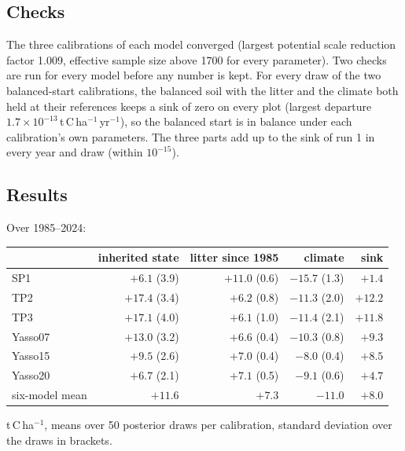 \documentclass[../HIKET_draft_v1.tex]{subfiles}
\begin{document}
\subsection{Checks}
\label{app:attr_checks}

The three calibrations of each model converged (largest potential scale reduction factor
1.009, effective sample size above 1700 for every parameter). Two checks are run for every
model before any number is kept. For every draw of the two balanced-start calibrations, the
balanced soil with the litter and the climate both held at their references keeps a sink of
zero on every plot (largest departure $1.7\times10^{-13}$\,t\,C\,ha$^{-1}$\,yr$^{-1}$), so the
balanced start is in balance under each calibration's own parameters. The three parts add up
to the sink of run 1 in every year and draw (within $10^{-15}$).

\subsection{Results}
\label{app:attr_results}

Over 1985--2024:

\begin{center}
\small
\begin{tabular}{lrrrr}
\hline
 & inherited state & litter since 1985 & climate & sink \\
\hline
SP1     & $+6.1$ (3.9)  & $+11.0$ (0.6) & $-15.7$ (1.3) & $+1.4$  \\
TP2     & $+17.4$ (3.4) & $+6.2$ (0.8)  & $-11.3$ (2.0) & $+12.2$ \\
TP3     & $+17.1$ (4.0) & $+6.1$ (1.0)  & $-11.4$ (2.1) & $+11.8$ \\
Yasso07 & $+13.0$ (3.2) & $+6.6$ (0.4)  & $-10.3$ (0.8) & $+9.3$  \\
Yasso15 & $+9.5$ (2.6)  & $+7.0$ (0.4)  & $-8.0$ (0.4)  & $+8.5$  \\
Yasso20 & $+6.7$ (2.1)  & $+7.1$ (0.5)  & $-9.1$ (0.6)  & $+4.7$  \\
\hline
six-model mean & $+11.6$ & $+7.3$ & $-11.0$ & $+8.0$ \\
\hline
\end{tabular}

{\footnotesize t\,C\,ha$^{-1}$, means over 50 posterior draws per calibration, standard deviation
over the draws in brackets.}
\end{center}
\end{document}

